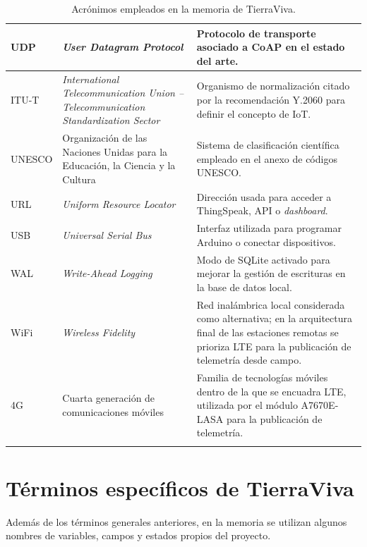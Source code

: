 \begin{longtable}{|p{}|p{}|p{}|}
\hline
UDP & \textit{User Datagram Protocol} & Protocolo de transporte asociado a CoAP en el estado del arte. \\
\hline
ITU-T & \textit{International Telecommunication Union -- Telecommunication Standardization Sector} & Organismo de normalización citado por la recomendación Y.2060 para definir el concepto de IoT. \\
\hline
UNESCO & Organización de las Naciones Unidas para la Educación, la Ciencia y la Cultura & Sistema de clasificación científica empleado en el anexo de códigos UNESCO. \\
\hline
URL & \textit{Uniform Resource Locator} & Dirección usada para acceder a ThingSpeak, API o \textit{dashboard}. \\
\hline
USB & \textit{Universal Serial Bus} & Interfaz utilizada para programar Arduino o conectar dispositivos. \\
\hline
WAL & \textit{Write-Ahead Logging} & Modo de SQLite activado para mejorar la gestión de escrituras en la base de datos local. \\
\hline
WiFi & \textit{Wireless Fidelity} & Red inalámbrica local considerada como alternativa; en la arquitectura final de las estaciones remotas se prioriza LTE para la publicación de telemetría desde campo. \\
\hline
4G & Cuarta generación de comunicaciones móviles & Familia de tecnologías móviles dentro de la que se encuadra LTE, utilizada por el módulo A7670E-LASA para la publicación de telemetría. \\
\hline
\caption{Acrónimos empleados en la memoria de TierraViva.}
\label{tab:acronimos_tierraviva}\\
\end{longtable}

\normalsize

\section{Términos específicos de TierraViva}

Además de los términos generales anteriores, en la memoria se utilizan algunos nombres de variables, campos y estados propios del proyecto.

\renewcommand{\arraystretch}{1.50}
\scriptsize

